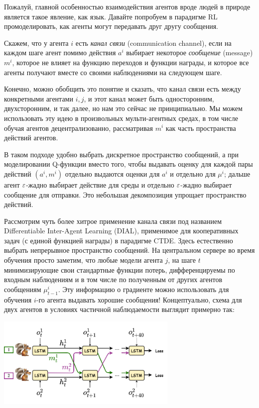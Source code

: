 Пожалуй, главной особенностью взаимодействия агентов вроде людей в природе является такое явление, как язык. Давайте попробуем в парадигме RL промоделировать, как агенты могут передавать друг другу сообщения.

\begin{definition}
Скажем, что у агента $i$ есть \emph{канал связи} (communication channel), если на каждом шаге агент помимо действия $a^i$ выбирает некоторое \emph{сообщение} (message) $m^i$, которое не влияет на функцию переходов и функции награды, и которое все агенты получают вместе со своими наблюдениями на следующем шаге.
\end{definition}

Конечно, можно обобщить это понятие и сказать, что канал связи есть между конкретными агентами $i, j$, и этот канал может быть односторонним, двухсторонним, и так далее, но нам это сейчас не принципиально. Мы можем использовать эту идею в произвольных мульти-агентных средах, в том числе обучая агентов децентрализованно, рассматривая $m^i$ как часть пространства действий агентов.

\begin{remark}
В таком подходе удобно выбрать дискретное пространство сообщений, а при моделировании Q-функции вместо того, чтобы выдавать оценку для каждой пары действий $(a^i, m^i)$ отдельно выдаются оценки для $a^i$ и отдельно для $\mu^i$; дальше агент $\varepsilon$-жадно выбирает действие для среды и отдельно $\varepsilon$-жадно выбирает сообщение для отправки. Это небольшая декомпозиция упрощает пространство действий.
\end{remark}

Рассмотрим чуть более хитрое применение канала связи под названием Differentiable Inter-Agent Learning (DIAL), применимое для кооперативных задач (с единой функцией награды) в парадигме CTDE. Здесь естественно выбрать непрерывное пространство сообщений. На центральном сервере во время обучения просто заметим, что любые модели агента $j$, на шаге $t$ минимизирующие свои стандартные функции потерь, дифференцируемы по входным наблюдениям и в том числе по полученным от других агентов сообщениям $\mu^i_{t-1}$. Эту информацию о градиенте можно использовать для обучения $i$-го агента выдавать хорошие сообщения! Концептуально, схема для двух агентов в условиях частичной наблюдаемости выглядит примерно так:

\begin{center}
    \includegraphics[width=0.65\textwidth]{Images/Communication.png}
\end{center}

